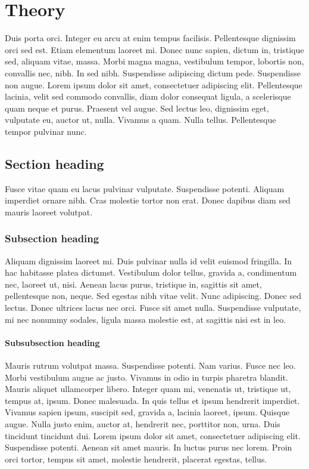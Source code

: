 \chapter{Theory}
\label{ch:theory}

Duis porta orci. Integer eu arcu at enim tempus facilisis. Pellentesque dignissim orci sed est. Etiam elementum laoreet mi. Donec nunc sapien, dictum in, tristique sed, aliquam vitae, massa. Morbi magna magna, vestibulum tempor, lobortis non, convallis nec, nibh. In sed nibh. Suspendisse adipiscing dictum pede. Suspendisse non augue. Lorem ipsum dolor sit amet, consectetuer adipiscing elit. Pellentesque lacinia, velit sed commodo convallis, diam dolor consequat ligula, a scelerisque quam neque et purus. Praesent vel augue. Sed lectus leo, dignissim eget, vulputate eu, auctor ut, nulla. Vivamus a quam. Nulla tellus. Pellentesque tempor pulvinar nunc.

\section{Section heading}

Fusce vitae quam eu lacus pulvinar vulputate. Suspendisse potenti. Aliquam imperdiet ornare nibh. Cras molestie tortor non erat. Donec dapibus diam sed mauris laoreet volutpat. 

\subsection{Subsection heading}

Aliquam dignissim laoreet mi. Duis pulvinar nulla id velit euismod fringilla. In hac habitasse platea dictumst. Vestibulum dolor tellus, gravida a, condimentum nec, laoreet ut, nisi. Aenean lacus purus, tristique in, sagittis sit amet, pellentesque non, neque. Sed egestas nibh vitae velit. Nunc adipiscing. Donec sed lectus. Donec ultrices lacus nec orci. Fusce sit amet nulla. Suspendisse vulputate, mi nec nonummy sodales, ligula massa molestie est, at sagittis nisi est in leo.

\subsubsection{Subsubsection heading}

Mauris rutrum volutpat massa. Suspendisse potenti. Nam varius. Fusce nec leo. Morbi vestibulum augue ac justo. Vivamus in odio in turpis pharetra blandit. Mauris aliquet ullamcorper libero. Integer quam mi, venenatis ut, tristique ut, tempus at, ipsum. Donec malesuada. In quis tellus et ipsum hendrerit imperdiet. Vivamus sapien ipsum, suscipit sed, gravida a, lacinia laoreet, ipsum. Quisque augue. Nulla justo enim, auctor at, hendrerit nec, porttitor non, urna. Duis tincidunt tincidunt dui. Lorem ipsum dolor sit amet, consectetuer adipiscing elit. Suspendisse potenti. Aenean sit amet mauris. In luctus purus nec lorem. Proin orci tortor, tempus sit amet, molestie hendrerit, placerat egestas, tellus.

